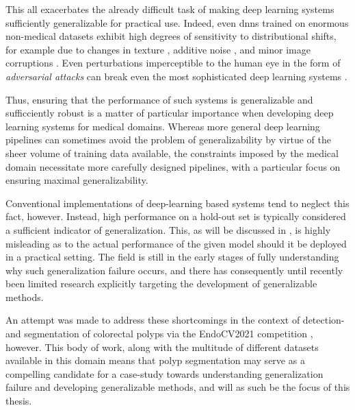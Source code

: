     This all exacerbates the already difficult task of making deep learning systems sufficiently generalizable for practical use. Indeed, even \glspl{dnn} trained on enormous non-medical datasets exhibit high degrees of sensitivity to distributional shifts, for example due to changes in texture \cite{texturebias}, additive noise \cite{noise_robustness}, and minor image corruptions \cite{corruption_robustness}. Even perturbations imperceptible to the human eye in the form of \textit{adversarial attacks} can break even the most sophisticated deep learning systems \cite{adversarial_attacks}.
    
    Thus, ensuring that the performance of such systems is generalizable and sufficciently robust is a matter of particular importance when developing deep learning systems for medical domains. Whereas more general deep learning pipelines can sometimes avoid the problem of generalizability by virtue of the sheer volume of training data available, the constraints imposed by the medical domain necessitate more carefully designed pipelines, with a particular focus on ensuring maximal generalizability. 
    
    Conventional implementations of deep-learning based systems tend to neglect this fact, however. Instead, high performance on a hold-out set is typically considered a sufficient indicator of generalization. This, as will be discussed in , is highly misleading as to the actual performance of the given model should it be deployed in a practical setting. The field is still in the early stages of fully understanding why such generalization failure occurs, and there has consequently until recently been limited research explicitly targeting the development of generalizable methods. 
    
    An attempt was made to address these shortcomings in the context of detection- and segmentation of colorectal polyps via the EndoCV2021 competition \cite{endocv2021}, however. This body of work, along with the multitude of different datasets available in this domain means that polyp segmentation may serve as a compelling candidate for a case-study towards understanding generalization failure and developing generalizable methods, and will as such be the focus of this thesis.   
    
